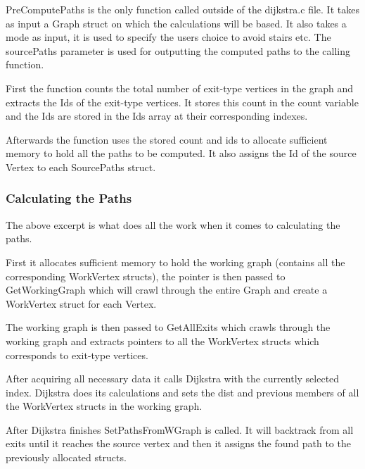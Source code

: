 PreComputePaths is the only function called outside of the dijkstra.c file. It takes as input a Graph struct on which the calculations will be based. It also takes a mode as input, it is used to specify the users choice to avoid stairs etc. The sourcePaths parameter is used for outputting the computed paths to the calling function.



First the function counts the total number of exit-type vertices in the graph and extracts the Ids of the exit-type vertices. It stores this count in the count variable and the Ids are stored in the Ids array at their corresponding indexes.



Afterwards the function uses the stored count and ids to allocate sufficient memory to hold all the paths to be computed. It also assigns the Id of the source Vertex to each SourcePaths struct.

\subsubsection{Calculating the Paths}



The above excerpt is what does all the work when it comes to calculating the paths.

First it allocates sufficient memory to hold the working graph (contains all the corresponding WorkVertex structs), the pointer is then passed to GetWorkingGraph which will crawl through the entire Graph and create a WorkVertex struct for each Vertex.

The working graph is then passed to GetAllExits which crawls through the working graph and extracts pointers to all the WorkVertex structs which corresponds to exit-type vertices.

After acquiring all necessary data it calls Dijkstra with the currently selected index. Dijkstra does its calculations and sets the dist and previous members of all the WorkVertex structs in the working graph.

After Dijkstra finishes SetPathsFromWGraph is called. It will backtrack from all exits until it reaches the source vertex and then it assigns the found path to the previously allocated structs.